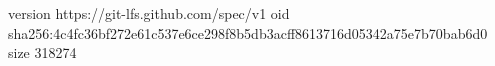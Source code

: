 version https://git-lfs.github.com/spec/v1
oid sha256:4c4fc36bf272e61c537e6ce298f8b5db3acff8613716d05342a75e7b70bab6d0
size 318274
